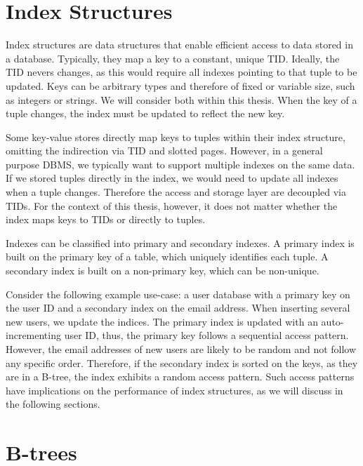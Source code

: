 \section{Index Structures}
Index structures are data structures that enable efficient access to data stored in a database.
Typically, they map a key to a constant, unique \ac{TID}.
Ideally, the \ac{TID} nevers changes, as this would require all indexes pointing to that tuple to be updated.
Keys can be arbitrary types and therefore of fixed or variable size, such as integers or strings.
We will consider both within this thesis.
When the key of a tuple changes, the index must be updated to reflect the new key.

Some key-value stores directly map keys to tuples within their index structure, omitting the indirection via \ac{TID} and slotted pages.
However, in a general purpose \ac{DBMS}, we typically want to support multiple indexes on the same data.
If we stored tuples directly in the index, we would need to update all indexes when a tuple changes.
Therefore the access and storage layer are decoupled via \ac{TID}s.
For the context of this thesis, however, it does not matter whether the index maps keys to \ac{TID}s or directly to tuples.

Indexes can be classified into primary and secondary indexes.
A primary index is built on the primary key of a table, which uniquely identifies each tuple.
A secondary index is built on a non-primary key, which can be non-unique.

Consider the following example use-case: a user database with a primary key on the user ID and a secondary index on the email address.
When inserting several new users, we update the indices.
The primary index is updated with an auto-incrementing user ID, thus, the primary key follows a sequential access pattern.
However, the email addresses of new users are likely to be random and not follow any specific order.
Therefore, if the secondary index is sorted on the keys, as they are in a B-tree, the index exhibits a random access pattern.
Such access patterns have implications on the performance of index structures, as we will discuss in the following sections.


\section{B-trees}

